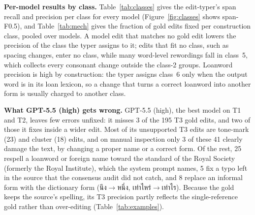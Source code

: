 \documentclass[11pt]{article}
\begin{document}
\textbf{Per-model results by class.} Table~\ref{tab:classes} gives the edit-typer's span recall
and precision per class for every model (Figure~\ref{fig:classes} shows span-F0.5), and
Table~\ref{tab:mech} gives the fraction of gold edits fixed per construction class, pooled over
models. A model edit that matches no gold edit lowers the precision of the class the typer
assigns to it; edits that fit no class, such as spacing changes, enter no class, while many
word-level rewordings fall in class~5, which collects every consonant change outside the class-2
groups. Loanword
precision is high by construction: the typer assigns class~6 only when the output word is in its
loan lexicon, so a change that turns a correct loanword into another form is usually charged to
another class.

\textbf{What GPT-5.5 (high) gets wrong.} GPT-5.5 (high), the best model on T1 and T2, leaves few
errors unfixed: it misses 3 of the 195 T3 gold edits, and two of those it fixes inside a wider
edit. Most of its unsupported T3 edits are tone-mark (23) and cluster (18) edits, and on manual
inspection only 3 of these 41 clearly damage the text, by changing a proper name or a correct
form. Of the rest, 25 respell a loanword or foreign name toward the standard of the Royal Society (formerly the
Royal Institute), which the system prompt names, 5 fix a typo left in the source that the
consensus audit did not catch, and 8 replace an informal form with the dictionary form
(นึง$\to$หนึ่ง, เท่าไหร่$\to$เท่าไร). Because the gold keeps the source's spelling, its T3
precision partly reflects the single-reference gold rather than over-editing
(Table~\ref{tab:examples}).
\end{document}
